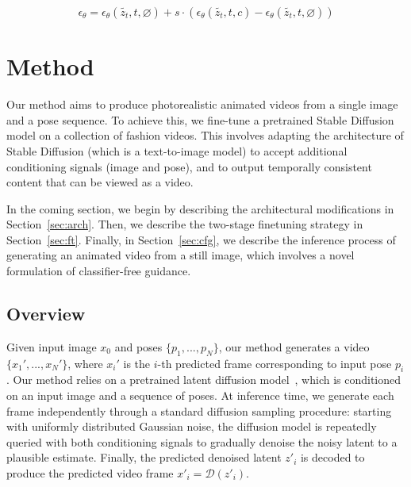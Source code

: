         \begin{equation}
            \epsilon_{\theta} = \epsilon_{\theta}(\tilde{z_t}, t, \varnothing) + s \cdot (\epsilon_{\theta}(\tilde{z_t}, t, c) - \epsilon_{\theta}(\tilde{z_t}, t, \varnothing))
        \end{equation}
        \label{eq:cfg}
    
\vspace{-2em}
\section{Method}
    Our method aims to produce photorealistic animated videos from a single image and a pose sequence. To achieve this, we fine-tune a pretrained Stable Diffusion model on a collection of fashion videos. This involves adapting the architecture of Stable Diffusion (which is a text-to-image model) to accept additional conditioning signals (image and pose), and to output temporally consistent content that can be viewed as a video.  

    In the coming section, we begin by  describing the architectural modifications in Section~\ref{sec:arch}. Then, we describe the two-stage finetuning strategy in Section~\ref{sec:ft}. Finally, in Section~\ref{sec:cfg}, we describe the inference process of generating an animated video from a still image, which involves a novel formulation of classifier-free guidance.
    

    \subsection{Overview}
        Given input image $x_0$ and poses $\{p_1, ..., p_N\}$, our method generates a video $\{x_1', ..., x_N'\}$, where $x_i'$ is the $i$-th predicted frame corresponding to input pose $p_i$. Our method relies on a pretrained latent diffusion model~\cite{stable_diffusion}, which is conditioned on an input image and a sequence of poses. At inference time, we generate each frame independently through a standard diffusion sampling procedure: starting with uniformly distributed Gaussian noise, the diffusion model is repeatedly queried with both conditioning signals to gradually denoise the noisy latent to a plausible estimate. Finally, the predicted denoised latent $z'_i$ is decoded to produce the predicted video frame $x'_i = \mathcal{D}(z'_i)$.
        
